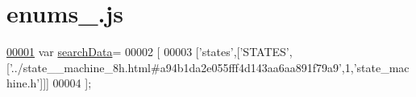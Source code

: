 \hypertarget{enums__4_8js_source}{}\section{enums\+\_.\+js}
\label{enums__4_8js_source}

\begin{DoxyCode}
\hypertarget{enums__4_8js_source.tex_l00001}{}\hyperlink{enums__4_8js_ad01a7523f103d6242ef9b0451861231e}{00001} var \hyperlink{enums__4_8js_ad01a7523f103d6242ef9b0451861231e}{searchData}=
00002 [
00003   [\textcolor{stringliteral}{'states'},[\textcolor{stringliteral}{'STATES'},[\textcolor{stringliteral}{'../state\_\_machine\_8h.html#a94b1da2e055fff4d143aa6aa891f79a9'},1,\textcolor{stringliteral}{'state\_machine.h'}]]]
00004 ];
\end{DoxyCode}
